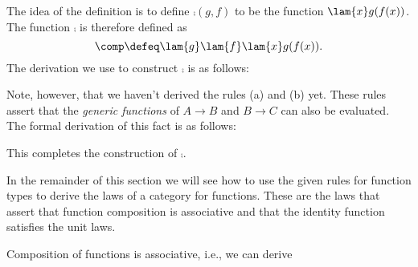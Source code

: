 \begin{constr}
  The idea of the definition is to define $\comp(g,f)$ to be the function $\lam{x}g(f(x))$. The function $\comp$ is therefore defined as
  \begin{equation*}
    \comp\defeq \lam{g}\lam{f}\lam{x}g(f(x)).
  \end{equation*}
  The derivation we use to construct $\comp$ is as follows:
  \begin{small}
  \begin{prooftree}
  \end{prooftree}
  \end{small}
  Note, however, that we haven't derived the rules (a) and (b) yet. These rules assert that the \emph{generic functions} of $A\to B$ and $B\to C$ can also be evaluated. The formal derivation of this fact is as follows:
  \begin{prooftree}
  \end{prooftree}
  This completes the construction of $\comp$.
\end{constr}

In the remainder of this section we will see how to use the given rules for function types to derive the laws of a category for functions. These are the laws that assert that function composition is associative and that the identity function satisfies the unit laws.

\begin{lem}
Composition of functions is associative, i.e., we can derive
\begin{prooftree}
\end{prooftree}
\end{lem}

